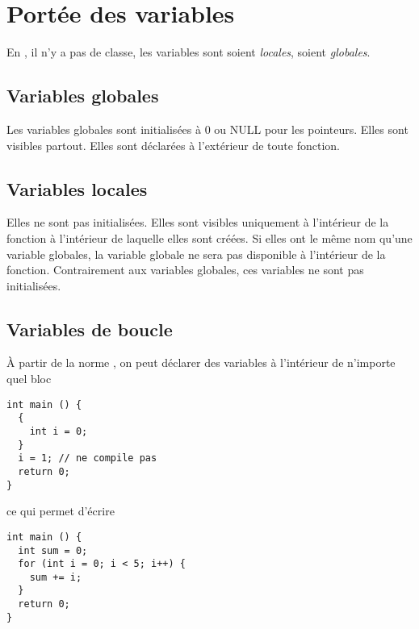 \section{Portée des variables}
En \clang{}, il n'y a pas de classe,
les variables sont soient \emph{locales}, soient \emph{globales}.

\subsection{Variables globales}
Les variables globales sont initialisées à 0 ou NULL pour les pointeurs.
Elles sont visibles partout.
Elles sont déclarées à l'extérieur de toute fonction.

\subsection{Variables locales}
Elles ne sont pas initialisées.
Elles sont visibles uniquement à l'intérieur de la fonction à l'intérieur
de laquelle elles sont créées.
Si elles ont le même nom qu'une variable globales,
la variable globale ne sera pas disponible à l'intérieur de la fonction.
Contrairement aux variables globales, ces variables ne sont pas
initialisées.

\subsection{Variables de boucle}
À partir de la norme ,
on peut déclarer des variables à l'intérieur
de n'importe quel bloc
\begin{lstlisting}
int main () {
  {
    int i = 0;
  }
  i = 1; // ne compile pas
  return 0;
}
\end{lstlisting}
ce qui permet d'écrire
\begin{lstlisting}
int main () {
  int sum = 0;
  for (int i = 0; i < 5; i++) {
    sum += i;
  }
  return 0;
}
\end{lstlisting}


%





